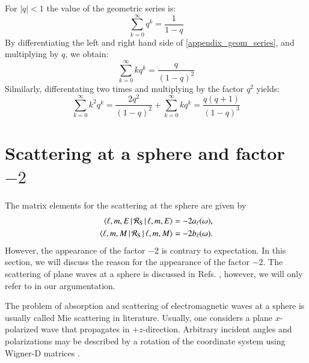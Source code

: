 For $|q|<1$ the value of the geometric series is:
\begin{equation}
\label{appendix_geom_series}
\sum_{k=0}^\infty q^k = \frac{1}{1-q}
\end{equation}
By differentiating the left and right hand side of
\eqref{appendix_geom_series}, and multiplying by $q$, we obtain:
\begin{equation}
\label{appendix_geom_series_k}
\sum_{k=0}^\infty kq^k = \frac{q}{(1-q)^2}
\end{equation}
Silmilarly, differentating two times and multiplying by the factor $q^2$ yields:
\begin{equation}
\label{appendix_geom_series_k2}
\sum_{k=0}^\infty k^2 q^k = \frac{2q^2}{(1-q)^2} + \sum_{k=0}^\infty kq^k = \frac{q(q+1)}{(1-q)^3}
\end{equation}


\section{Scattering at a sphere and factor $-2$}
\label{appendix_factor2}

The matrix elements for the scattering at the sphere are given by
\begin{align}
\label{eq:appendix_mie_a}
\braket{\ell,m,E \, | \, \mathcal{R}_\text{S} \, | \, \ell,m,E} &= -2 a_\ell(\omega), \\
\label{eq:appendix_mie_b}
\braket{\ell,m,M \, | \, \mathcal{R}_\text{S} \, | \, \ell,m,M} &= -2 b_\ell(\omega).
\end{align}
However, the appearance of the factor $-2$ is contrary to expectation.
In this section, we will discuss the reason for the appearance of the factor $-2$.
The scattering of plane waves at a sphere is discussed in Refs. \cite{jackson, kerker},
however, we will only refer to \cite{bohrenhuffman} in our argumentation.

The problem of absorption and scattering of electromagnetic waves at a sphere
is usually called Mie scattering in literature. Usually, one considers
a plane $x$-polarized wave that propagates in $+z$-direction. Arbitrary
incident angles and polarizations may be described by a rotation of the
coordinate system using Wigner-D matrices \cite{biedenharn, rose}.

